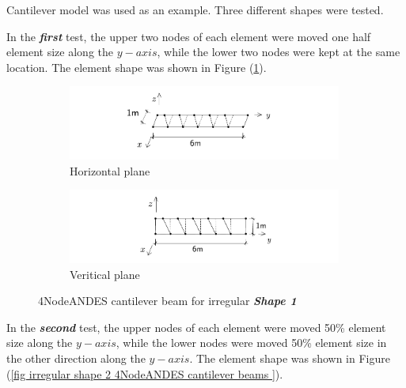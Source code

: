 \documentclass[fleqn,11pt]{article}
\begin{document}
Cantilever model was used as an example. 
Three different shapes were tested. 


In the \emph{\textbf{first}} test, the upper two nodes of each element were moved one half element size along the $y-axis$, while the lower two nodes were kept at the same location. The element shape was shown in Figure (\ref{fig irregular shape 1 4NodeANDES cantilever beams }).


\begin{figure}[H]
  \centering
    \begin{subfigure}{0.5\textwidth}
      \centering
      \includegraphics[width=9cm]{../Figure-files/beam_ANDES_xy_bending_pureshape1.pdf}
      \caption{Horizontal plane}
    \end{subfigure}
    \begin{subfigure}{0.5\textwidth}
      \centering
      \includegraphics[width=9cm]{../Figure-files/beam_ANDES_yz_inPlane_pureshape1.pdf}
      \caption{Veritical  plane}
    \end{subfigure}
  \caption{4NodeANDES cantilever beam for irregular \textbf{\emph{Shape 1}} }
  \label{fig irregular shape 1 4NodeANDES cantilever beams }
\end{figure}





In the \emph{\textbf{second}} test, the upper nodes of each element were moved 50\% element size along the $y-axis$, while the lower nodes were moved 50\% element size in the other direction along the $y-axis$. The element shape was shown in Figure (\ref{fig irregular shape 2 4NodeANDES cantilever beams }).
\end{document}

